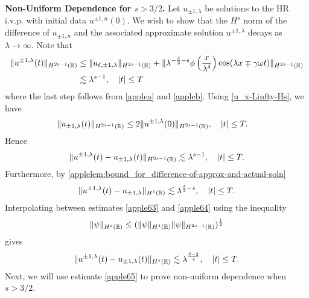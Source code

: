 \textbf{Non-Uniform Dependence for $s>3/2$.}
Let $u_{\pm 1,\lambda}$ be solutions to the HR i.v.p. with initial 
data $u^{\pm 1,
n}(0)$. We wish to show that the $H^s$ norm of the difference of $u_{\pm 1,
n}$ and the associated approximate solution $u^{\pm 1,\lambda}$
decays as $\lambda \to \infty$. Note that
%
%
\begin{equation*}
\begin{split}
\label{apple62}
 \|u^{\pm 1, \lambda}(t)\|_{H^{2s-1}(\mathbb{R})}
 & \le \|u_{\ell, \pm 1, \lambda}\|_{H^{2s-1}(\mathbb{R})} +
\| \lambda^{-\frac{\delta}{2} -s} \phi \left(
\frac{x}{\lambda^\delta} \right) \cos(\lambda x \mp \gamma \omega t)
\|_{H^{2s-1}(\mathbb{R})}
\\
& \lesssim \lambda^{s-1}, \quad |t| \le T
\end{split}
\end{equation*}
%
%
where the last step follows from \cref{applea} and \cref{appleb}.
Using \eqref{u_x-Linfty-Hs}, we have 
%
\begin{equation*}
\begin{split}
\|u_{\pm 1,\lambda} (t) \|_{H^{2s-1}(\mathbb{R})}
& \le 2 \|u^{\pm 1,\lambda}(0) \|_{H^{2s-1}(\mathbb{R})}, \quad
|t| \le T.
\label{apple60}
\end{split}
\end{equation*}
%
%
%
%
Hence
%
\begin{equation}
\begin{split}
\|u^{\pm 1, \lambda}(t) - u_{\pm 1, \lambda}(t) \|_{H^{2s-1}(\mathbb{R})}
\lesssim \lambda^{s-1}, \quad |t| \le T.
\label{apple63}
\end{split}
\end{equation}
%
%
Furthermore, by 
\cref{applelem:bound_for_difference-of-approx-and-actual-soln} 
%
%
\begin{equation}
\begin{split}
\|u^{\pm 1, \lambda}(t) - u_{\pm 1, \lambda} \|_{H^1(\mathbb{R})} \lesssim
\lambda^{\frac{\delta}{2} -s}, \quad |t| \le T.
\label{apple64}
\end{split}
\end{equation}
%
%
%
%
%
%
%
%
Interpolating between estimates \eqref{apple63} and \eqref{apple64} using 
the inequality
\begin{equation*}
\label{apple403}
\|\psi \|_{H^s (\mathbb{R})} \leq  (\| \psi \|_{H^1 (\mathbb{R})} \| \psi
\|_{H^{2s-1}(\mathbb{R})})^\frac12
\end{equation*}
%
%
gives
%
%
\begin{equation}
\begin{split}
\|u^{\pm 1, \lambda}(t) - u_{\pm 1, \lambda}(t)
\|_{H^s(\mathbb{R})}
\lesssim \lambda^{\frac{\delta -2}{4}}, \quad |t| \le T.
\label{apple65}
\end{split}
\end{equation}
%
%
Next, we will use estimate \eqref{apple65} to prove non-uniform
dependence when $s > 3/2$.

